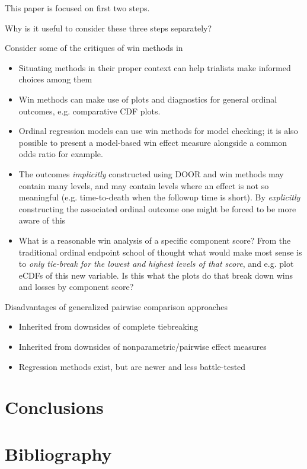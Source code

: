 \documentclass[
  11pt,
  fleqn
]{article}
\begin{document}
This paper is focused on first two steps.

Why is it useful to consider these three steps separately?

Consider some of the critiques of win methods in
\citet[e.g.~][]{ajufoFallaciesUsingWin2023}

\begin{itemize}
  \item Situating methods in their proper context can help
    trialists make informed choices among them
  \item Win methods can make use of
    plots and diagnostics for general ordinal outcomes, e.g.
    comparative CDF plots.
  \item Ordinal regression models can use win methods for model checking; it is
    also possible to present a model-based win effect measure alongside a common
    odds ratio for example.
  \item The outcomes \emph{implicitly} constructed using
    DOOR and win methods may contain many levels, and may contain
    levels where an
    effect is not so meaningful (e.g. time-to-death when the followup time is
    short). By \emph{explicitly} constructing the associated ordinal outcome one
    might be forced to be more aware of this
  \item What is a reasonable win
    analysis of a specific component score? From the traditional
    ordinal endpoint
    school of thought what would make most sense is to \emph{only
      tie-break for the
    lowest and highest levels of that score}, and e.g. plot eCDFs of this new
    variable. Is this what the plots do that break down wins and losses by
    component score?
\end{itemize}

Disadvantages of generalized pairwise comparison approaches
\begin{itemize}
  \item Inherited from downsides of complete tiebreaking
  \item Inherited from downsides of nonparametric/pairwise effect measures
  \item Regression methods exist, but are newer and less battle-tested
\end{itemize}


\section{Conclusions}

\newpage

\section{Bibliography}

\printbibliography
\end{document}

